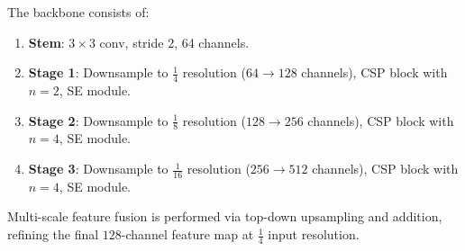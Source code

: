 The backbone consists of:
\begin{enumerate}
  \item \textbf{Stem}: $3\times3$ conv, stride 2, 64 channels.
  \item \textbf{Stage 1}: Downsample to $\frac{1}{4}$ resolution ($64\!\to\!128$ channels), CSP block with $n=2$, SE module.
  \item \textbf{Stage 2}: Downsample to $\frac{1}{8}$ resolution ($128\!\to\!256$ channels), CSP block with $n=4$, SE module.
  \item \textbf{Stage 3}: Downsample to $\frac{1}{16}$ resolution ($256\!\to\!512$ channels), CSP block with $n=4$, SE module.
\end{enumerate}
Multi-scale feature fusion is performed via top-down upsampling and addition, refining the final $128$-channel feature map at $\frac{1}{4}$ input resolution.
